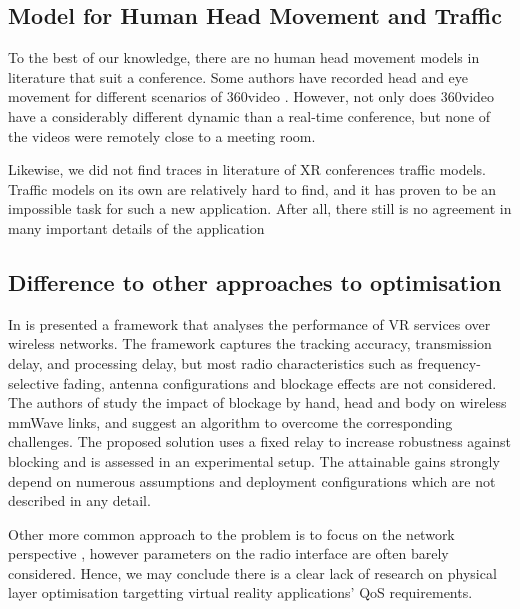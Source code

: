 \subsection*{Model for Human Head Movement and Traffic}

To the best of our knowledge, there are no human head movement models in literature that suit a conference. Some authors have recorded head and eye movement for different scenarios of 360\tdeg video \cite{avtrack360, dataset2}. However, not only does 360\tdeg video have a considerably different dynamic than a real-time conference, but none of the videos were remotely close to a meeting room.

Likewise, we did not find traces in literature of XR conferences traffic models. Traffic models on its own are relatively hard to find, and it has proven to be an impossible task for such a new application. After all, there still is no agreement \cite{3GPP_xr, multi_sensor_tno} in many important details of the application


\subsection*{Difference to other approaches to optimisation}

In \cite{8395443} is presented a framework that analyses the performance of VR services over wireless networks. The framework captures the tracking accuracy, transmission delay, and processing delay, but most radio characteristics such as frequency-selective fading, antenna configurations and blockage effects are not considered. The authors of \cite{cutting_the_cord} study the impact of blockage by hand, head and body on wireless \ac{mmWave} links, and suggest an algorithm to overcome the corresponding challenges. The proposed solution uses a fixed relay to increase robustness against blocking and is assessed in an experimental setup. The attainable gains strongly depend on numerous assumptions and deployment configurations which are not described in any detail. 


Other more common approach to the problem is to focus on the network perspective \cite{7997740, 8319985}, however parameters on the radio interface are often barely considered. Hence, we may conclude there is a clear lack of research on physical layer optimisation targetting virtual reality applications' \ac{QoS} requirements. 